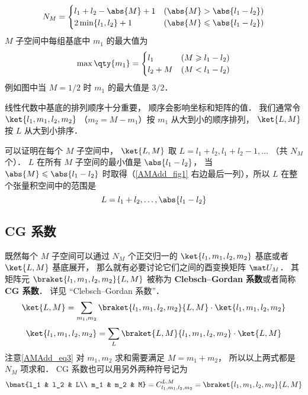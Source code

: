 \begin{equation}
N_M =
\begin{cases}
l_1 + l_2 - \abs{M} + 1 &(\abs{M} > \abs{l_1 - l_2}) \\
2\min\{l_1, l_2\}  + 1   &(\abs{M} \leqslant\abs{l_1 - l_2})
\end{cases}
\end{equation}
$M$ 子空间中每组基底中 $m_1$ 的最大值为
\begin{equation}
\max \qty{m_1} =
\begin{cases}
l_1 \quad &(M \geqslant l_1 - l_2)  \\
l_2 + M &(M < l_1 - l_2)
\end{cases}
\end{equation}
例如图中当 $M = 1/2$ 时 $m_1$ 的最大值是 $3/2$．

线性代数中基底的排列顺序十分重要， 顺序会影响坐标和矩阵的值． 我们通常令 $\ket{l_1, m_1, l_2, m_2}$ （$m_2 = M - m_1$）按 $m_1$ 从大到小的顺序排列， $\ket{L, M}$ 按 $L$ 从大到小排序．

可以证明在每个 $M$ 子空间中， $\ket{L, M}$ 取 $L = l_1 + l_2, l_1 + l_2 - 1,\dots$ （共 $N_M$ 个）． %
$L$ 在所有 $M$ 子空间的最小值是 $\abs{l_1 - l_2}$， 当 $\abs{M} \leqslant \abs{l_1 - l_2}$ 时取得（\autoref{AMAdd_fig1} 右边最后一列），所以 $L$ 在整个张量积空间中的范围是
\begin{equation}\label{AMAdd_eq2}
L = l_1 + l_2, \dots, \abs{l_1 - l_2}
\end{equation}

\subsection{CG 系数}
既然每个 $M$ 子空间可以通过 $N_M$ 个正交归一的 $\ket{l_1, m_1, l_2, m_2}$ 基底或者 $\ket{L,M}$ 基底展开， 那么就有必要讨论它们之间的酉变换矩阵 $\mat U_M$． 其矩阵元 $\braket{l_1, m_1, l_2, m_2}{L, M}$ 被称为 \textbf{Clebsch–Gordan 系数}或者简称 \textbf{CG 系数}． 详见 “Clebsch–Gordan 系数”．
\begin{equation}\label{AMAdd_eq3}
\ket{L, M} = \sum_{m_1, m_2}\braket{l_1, m_1, l_2, m_2}{L, M} \cdot \ket{l_1, m_1, l_2, m_2}
\end{equation}
\begin{equation}
\ket{l_1, m_1, l_2, m_2} = \sum_{L}\braket{L, M}{l_1, m_1, l_2, m_2} \cdot \ket{L, M}
\end{equation}
注意\autoref{AMAdd_eq3} 对 $m_1,m_2$ 求和需要满足 $M = m_1 + m_2$， 所以以上两式都是 $N_M$ 项求和． CG 系数也可以用另外两种符号记为
\begin{equation}
\bmat{l_1 & l_2 & L\\ m_1 & m_2 & M} = C_{l_1, m_1, l_2, m_2}^{L, M} = \braket{l_1, m_1, l_2, m_2}{L, M}
\end{equation}

